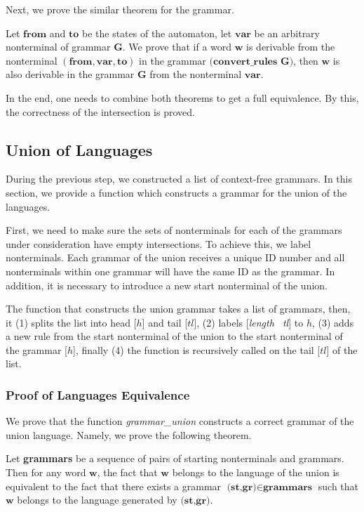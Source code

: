 Next, we prove the similar theorem for the grammar.

\begin{theorem}
	Let $ \textbf{from} $ and $ \textbf{to} $ be the states of the automaton, let $ \textbf{var} $ be an arbitrary nonterminal of grammar \textbf{G}. We prove that if a word $\textbf{w}$ is derivable from the nonterminal $ (\textbf{from}, \textbf{var}, \textbf{to}) $ in the grammar $ \textbf{(convert\_rules~G)}$, then $\textbf{w}$ is also derivable in the grammar $\textbf{G}$ from the nonterminal $ \textbf{var} $.
\end{theorem}

In the end, one needs to combine both theorems to get a full equivalence. By this, the correctness of the intersection is proved.

\subsection{Union of Languages}

During the previous step, we constructed a list of context-free grammars. In this section, we provide a function which constructs a grammar for the union of the languages.

First, we need to make sure the sets of nonterminals for each of the grammars under consideration have empty intersections. To achieve this, we label nonterminals. Each grammar of the union receives a unique ID number and all nonterminals within one grammar will have the same ID as the grammar. In addition, it is necessary to introduce a new start nonterminal of the union.

The function that constructs the union grammar takes a list of grammars, then, it (1) splits the list into head [$h$] and tail [$tl$], (2) labels [\textit{length \ tl}] to $h$, (3) adds a new rule from the start nonterminal of the union to the start nonterminal of the grammar [$h$], finally (4) the function is recursively called on the tail [$tl$] of the list.

\subsubsection{Proof of Languages Equivalence}

We prove that the function \textit{grammar\_union} constructs a correct grammar of the union language. Namely, we prove the following theorem.

\begin{theorem} \label{theorem-correct-union}
    Let \textbf{grammars} be a sequence of pairs of starting nonterminals and grammars. Then for any word $\textbf{w}$, the fact that $\textbf{w}$ belongs to the language of the union is equivalent to the fact that there exists a grammar $\textbf{(st,gr)} \in \textbf{grammars}$ such that $\textbf{w}$ belongs to the language generated by $\textbf{(st,gr)}$.
\end{theorem}


